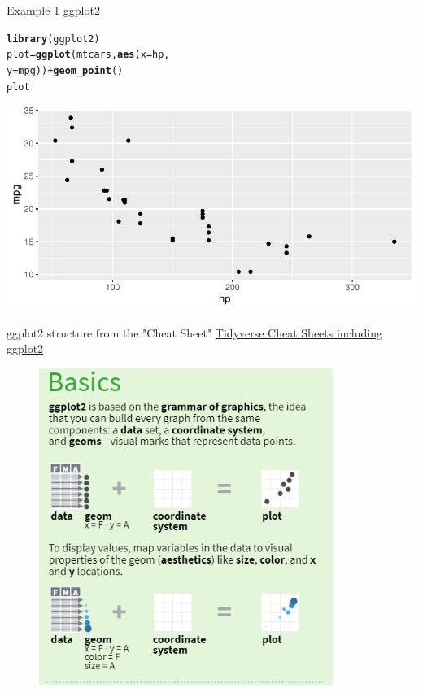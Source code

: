\documentclass{beamer}\usepackage[]{graphicx}\usepackage[]{xcolor}
\makeatletter
\newcommand{\hlopt}[1]{\textcolor[rgb]{0,0,0}{#1}}%
\newcommand{\hlstd}[1]{\textcolor[rgb]{0.345,0.345,0.345}{#1}}%
\newcommand{\hlkwb}[1]{\textcolor[rgb]{0.69,0.353,0.396}{#1}}%
\newcommand{\hlkwc}[1]{\textcolor[rgb]{0.333,0.667,0.333}{#1}}%
\newcommand{\hlkwd}[1]{\textcolor[rgb]{0.737,0.353,0.396}{\textbf{#1}}}%
\newenvironment{kframe}{%
 \def\at@end@of@kframe{}%
 \ifinner\ifhmode%
  \def\at@end@of@kframe{\end{minipage}}%
  \begin{minipage}{\columnwidth}%
 \fi\fi%
 \def\FrameCommand##1{\hskip\@totalleftmargin \hskip-\fboxsep
 \colorbox{shadecolor}{##1}\hskip-\fboxsep
     \hskip-\linewidth \hskip-\@totalleftmargin \hskip\columnwidth}%
 \MakeFramed {\advance\hsize-\width
   \@totalleftmargin\z@ \linewidth\hsize
   \@setminipage}}%
 {\par\unskip\endMakeFramed%
 \at@end@of@kframe}
\newenvironment{knitrout}{}{} %
\makeatother
\begin{document}
\begin{frame}[fragile]{Example 1 ggplot2}
\begin{knitrout}
\color{fgcolor}\begin{kframe}
\begin{alltt}
\hlkwd{library}\hlstd{(ggplot2)}
\hlstd{plot} \hlkwb{=} \hlkwd{ggplot}\hlstd{(mtcars,} \hlkwd{aes}\hlstd{(}\hlkwc{x} \hlstd{= hp,}
    \hlkwc{y} \hlstd{= mpg))} \hlopt{+} \hlkwd{geom_point}\hlstd{()}
\hlstd{plot}
\end{alltt}
\end{kframe}
\includegraphics[width=0.95\linewidth]{figure/unnamed-chunk-2-1} 
\end{knitrout}
\end{frame}

\begin{frame}{ggplot2 structure from the "Cheat Sheet"}
\href{https://www.rstudio.com/resources/cheatsheets/}{Tidyverse Cheat Sheets including ggplot2}
\begin{figure}
  \includegraphics[height=0.75\textheight]{ggplot2cheatsheetbasic.png}
\end{figure}
\end{frame}
\end{document}
